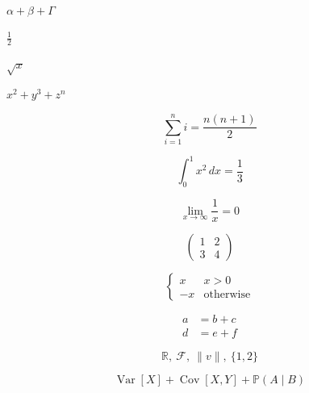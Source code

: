 \documentclass{article}
\begin{document}
$\alpha + \beta + \Gamma$

$\frac{1}{2}$

$\sqrt{x}$

$x^{2} + y^{3} + z^{n}$

\[
  \sum_{i=1}^{n} i = \frac{n(n+1)}{2}
\]

\[
  \int_{0}^{1} x^{2} \, dx = \frac{1}{3}
\]

\[
  \lim_{x \to \infty} \frac{1}{x} = 0
\]

\[
  \begin{pmatrix}
    1 & 2 \\
    3 & 4
  \end{pmatrix}
\]

\[
  \begin{cases}
    x & x > 0 \\
    -x & \text{otherwise}
  \end{cases}
\]

\[
  \begin{aligned}
    a &= b + c \\
    d &= e + f
  \end{aligned}
\]

\[
  \mathbb{R},\ \mathscr{F},\ \lVert v \rVert,\ \lbrace 1, 2 \rbrace
\]

\[
  \operatorname{Var}[X] + \operatorname{Cov}[X, Y] + \mathbb{P}(A \mid B)
\]
\end{document}
